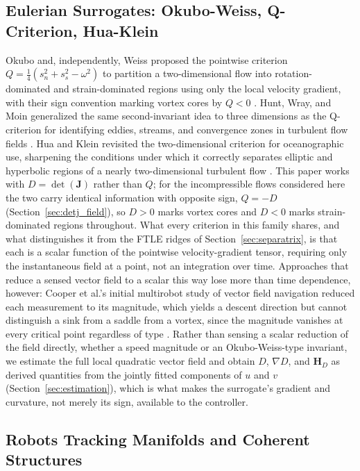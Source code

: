 \documentclass[lettersize,journal]{IEEEtran}
\begin{document}
\subsection{Eulerian Surrogates: Okubo-Weiss, Q-Criterion, Hua-Klein}

Okubo and, independently, Weiss proposed the pointwise criterion
$Q = \tfrac{1}{4}(s_n^2 + s_s^2 - \omega^2)$ to partition a two-dimensional
flow into rotation-dominated and strain-dominated regions using only the
local velocity gradient, with their sign convention marking vortex cores by
$Q < 0$ \cite{21,22}. Hunt, Wray, and Moin generalized the same second-invariant
idea to three dimensions as the Q-criterion for identifying eddies, streams,
and convergence zones in turbulent flow fields \cite{23}. Hua and Klein revisited
the two-dimensional criterion for oceanographic use, sharpening the
conditions under which it correctly separates elliptic and hyperbolic
regions of a nearly two-dimensional turbulent flow \cite{24}. This paper works
with $D = \det(\mathbf{J})$ rather than $Q$; for the incompressible flows
considered here the two carry identical information with opposite sign,
$Q = -D$ (Section~\ref{sec:detj_field}), so $D > 0$ marks vortex cores and
$D < 0$ marks strain-dominated regions throughout. What every criterion in
this family shares, and what distinguishes it from the FTLE ridges of
Section~\ref{sec:separatrix}, is that each is a scalar function of the
pointwise velocity-gradient tensor, requiring only the instantaneous field
at a point, not an integration over time. Approaches that reduce a sensed
vector field to a scalar this way lose more than time dependence, however:
Cooper et al.'s initial multirobot study of vector field navigation reduced
each measurement to its magnitude, which yields a descent direction but
cannot distinguish a sink from a saddle from a vortex, since the magnitude
vanishes at every critical point regardless of type \cite{25}. Rather than
sensing a scalar reduction of the field directly, whether a speed magnitude
or an Okubo-Weiss-type invariant, we estimate the full local quadratic
vector field and obtain $D$, $\nabla D$, and $\mathbf{H}_D$ as derived
quantities from the jointly fitted components of $u$ and $v$
(Section~\ref{sec:estimation}), which is what makes the surrogate's
gradient and curvature, not merely its sign, available to the controller.

\subsection{Robots Tracking Manifolds and Coherent Structures}
\end{document}
